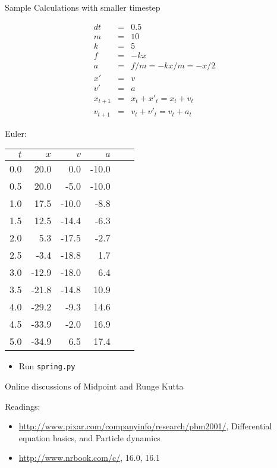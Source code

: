 \documentclass[handout,t,compress]{beamer}
\newcommand{\bframe}[1]{\begin{frame}[fragile]{#1}}
\begin{document}
\bframe{Sample Calculations with smaller timestep}
\begin{minipage}{2in}
\begin{eqnarray*}
dt &=& 0.5 \\
m &=& 10  \\
k &=& 5   \\
f &=& -kx \\
a &=& f/m = -kx/m = -x/2 \\
x' &=& v \\
v' &=& a \\
x_{t+1} &=& x_{t} + x'_{t} = x_{t} + v_{t} \\
v_{t+1} &=& v_{t} + v'_{t} = v_{t} + a_{t} 
\end{eqnarray*}
\end{minipage}
\hfill\begin{minipage}{2in}

Euler:\\
\begin{tabular}{r|rrr|rr}
$t$ & $x$ & $v$ & $a$ \\\hline
0.0 & 20.0 & 0.0 & -10.0 & \\
0.5 & 20.0 & -5.0 & -10.0 & \\
1.0 & 17.5 & -10.0 & -8.8 & \\
1.5 & 12.5 & -14.4 & -6.3 & \\
2.0 & 5.3 & -17.5 & -2.7 & \\
2.5 & -3.4 & -18.8 & 1.7 & \\
3.0 & -12.9 & -18.0 & 6.4 & \\
3.5 & -21.8 & -14.8 & 10.9 & \\
4.0 & -29.2 & -9.3 & 14.6 & \\
4.5 & -33.9 & -2.0 & 16.9 & \\
5.0 & -34.9 & 6.5 & 17.4 & \\
\end{tabular}
\end{minipage}

\begin{itemize}
\item
Run {\tt spring.py}
\end{itemize}
\end{frame}


\bframe{Online discussions of Midpoint and Runge Kutta}

Readings:
\begin{itemize}
\item \url{http://www.pixar.com/companyinfo/research/pbm2001/},
  Differential equation basics, and Particle dynamics
\item \url{http://www.nrbook.com/c/}, 16.0, 16.1
\end{itemize}
\end{frame}
\end{document}
